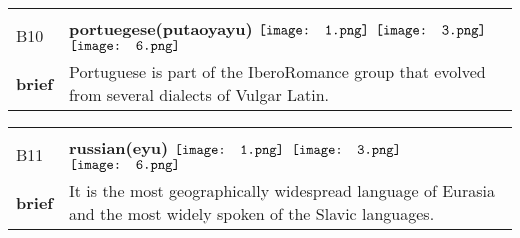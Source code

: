 \documentclass[UTF8]{article}
\begin{document}
            \begin{tabularx}{\textwidth}{p{1.5cm}X}
            \arrayrulecolor{myBlue}
        	\hline\\
            \small{B10}&
            \large{\bfseries{portuegese(putaoyayu)}}\hfill
                                                            $\vcenter{\hbox{\texttt{[image: 1.png]}}}$
                                                                \phantom{$\vcenter{\hbox{\texttt{[image: 2.png]}}}$}
                                                                $\vcenter{\hbox{\texttt{[image: 3.png]}}}$
                                                                \phantom{$\vcenter{\hbox{\texttt{[image: 4.png]}}}$}
                                                                \phantom{$\vcenter{\hbox{\texttt{[image: 5.png]}}}$}
                                                                $\vcenter{\hbox{\texttt{[image: 6.png]}}}$
                                                                \phantom{$\vcenter{\hbox{\texttt{[image: 7.png]}}}$}
                                        \\[10pt]
            \large{\bfseries{brief}}&\noindent\parbox[c]{\hsize}{Portuguese is part of the IberoRomance group that evolved from several dialects of Vulgar Latin.} \\[5pt]
            \hline\\[-10pt]
        \end{tabularx}
            \begin{tabularx}{\textwidth}{p{1.5cm}X}
            \arrayrulecolor{myBlue}
        	\hline\\
            \small{B11}&
            \large{\bfseries{russian(eyu)}}\hfill
                                                            $\vcenter{\hbox{\texttt{[image: 1.png]}}}$
                                                                \phantom{$\vcenter{\hbox{\texttt{[image: 2.png]}}}$}
                                                                $\vcenter{\hbox{\texttt{[image: 3.png]}}}$
                                                                \phantom{$\vcenter{\hbox{\texttt{[image: 4.png]}}}$}
                                                                \phantom{$\vcenter{\hbox{\texttt{[image: 5.png]}}}$}
                                                                $\vcenter{\hbox{\texttt{[image: 6.png]}}}$
                                                                \phantom{$\vcenter{\hbox{\texttt{[image: 7.png]}}}$}
                                        \\[10pt]
            \large{\bfseries{brief}}&\noindent\parbox[c]{\hsize}{It is the most geographically widespread language of Eurasia and the most widely spoken of the Slavic languages. } \\[5pt]
            \hline\\[-10pt]
        \end{tabularx}
\end{document}
